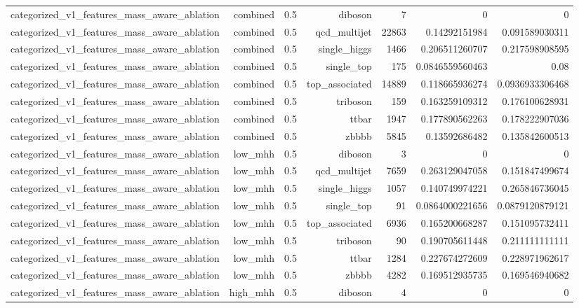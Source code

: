 \begin{table}[htbp]
{\begin{tabular}{lrrrrrr}
categorized\_v1\_features\_mass\_aware\_ablation & combined & 0.5 & diboson & 7 & 0 & 0 \\
categorized\_v1\_features\_mass\_aware\_ablation & combined & 0.5 & qcd\_multijet & 22863 & 0.14292151984 & 0.091589030311 \\
categorized\_v1\_features\_mass\_aware\_ablation & combined & 0.5 & single\_higgs & 1466 & 0.206511260707 & 0.217598908595 \\
categorized\_v1\_features\_mass\_aware\_ablation & combined & 0.5 & single\_top & 175 & 0.0846559560463 & 0.08 \\
categorized\_v1\_features\_mass\_aware\_ablation & combined & 0.5 & top\_associated & 14889 & 0.118665936274 & 0.0936933306468 \\
categorized\_v1\_features\_mass\_aware\_ablation & combined & 0.5 & triboson & 159 & 0.163259109312 & 0.176100628931 \\
categorized\_v1\_features\_mass\_aware\_ablation & combined & 0.5 & ttbar & 1947 & 0.177890562263 & 0.178222907036 \\
categorized\_v1\_features\_mass\_aware\_ablation & combined & 0.5 & zbbbb & 5845 & 0.13592686482 & 0.135842600513 \\
categorized\_v1\_features\_mass\_aware\_ablation & low\_mhh & 0.5 & diboson & 3 & 0 & 0 \\
categorized\_v1\_features\_mass\_aware\_ablation & low\_mhh & 0.5 & qcd\_multijet & 7659 & 0.263129047058 & 0.151847499674 \\
categorized\_v1\_features\_mass\_aware\_ablation & low\_mhh & 0.5 & single\_higgs & 1057 & 0.140749974221 & 0.265846736045 \\
categorized\_v1\_features\_mass\_aware\_ablation & low\_mhh & 0.5 & single\_top & 91 & 0.0864000221656 & 0.0879120879121 \\
categorized\_v1\_features\_mass\_aware\_ablation & low\_mhh & 0.5 & top\_associated & 6936 & 0.165200668287 & 0.151095732411 \\
categorized\_v1\_features\_mass\_aware\_ablation & low\_mhh & 0.5 & triboson & 90 & 0.190705611448 & 0.211111111111 \\
categorized\_v1\_features\_mass\_aware\_ablation & low\_mhh & 0.5 & ttbar & 1284 & 0.227674272609 & 0.228971962617 \\
categorized\_v1\_features\_mass\_aware\_ablation & low\_mhh & 0.5 & zbbbb & 4282 & 0.169512935735 & 0.169546940682 \\
categorized\_v1\_features\_mass\_aware\_ablation & high\_mhh & 0.5 & diboson & 4 & 0 & 0 \\

\end{tabular}}
\end{table}
